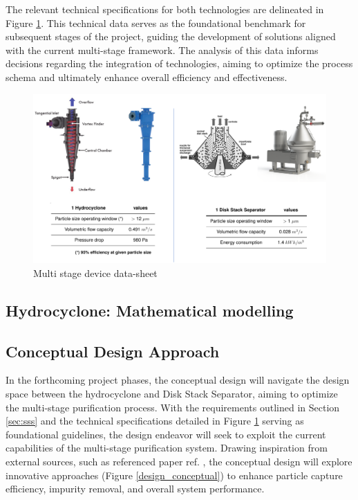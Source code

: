 \noindent The relevant technical specifications for both technologies are delineated in Figure \ref{multi_stage_technical}. This technical data serves as the foundational benchmark for subsequent stages of the project, guiding the development of solutions aligned with the current multi-stage framework. The analysis of this data informs decisions regarding the integration of technologies, aiming to optimize the process schema and ultimately enhance overall efficiency and effectiveness.

\begin{figure}[H]
	\centering
	\includegraphics[width=1\linewidth]{multi_stage_technical.png}
	\captionsetup{font=bf, size=small}
	\caption{Multi stage device data-sheet}
	\label{multi_stage_technical}
\end{figure}

\newpage
\subsection{Hydrocyclone: Mathematical modelling}






\newpage
\subsection{Conceptual Design Approach}
In the forthcoming project phases, the conceptual design will navigate the design space between the hydrocyclone and Disk Stack Separator, aiming to optimize the multi-stage purification process. With the requirements outlined in Section \ref{sec:sss} and the technical specifications detailed in Figure \ref{multi_stage_technical} serving as foundational guidelines, the design endeavor will seek to exploit the current capabilities of the multi-stage purification system. Drawing inspiration from external sources, such as referenced paper ref. \cite{Van}, the conceptual design will explore innovative approaches (Figure \ref{design_conceptual}) to enhance particle capture efficiency, impurity removal, and overall system performance.\\


